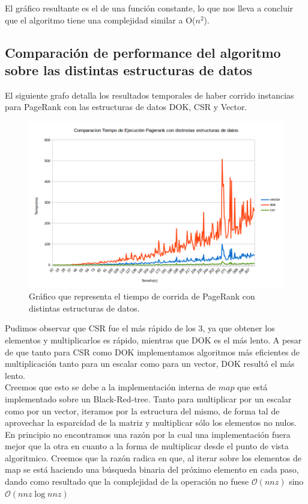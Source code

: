 El gráfico resultante es el de una función constante, lo que nos lleva a concluir que el algoritmo tiene una complejidad similar a O($n^{2}$).

\subsection{Comparación de performance del algoritmo sobre las distintas estructuras de datos}

El siguiente grafo detalla los resultados temporales de haber corrido instancias para PageRank con las estructuras de datos DOK, CSR y Vector.

\begin{figure}[h]
  \includegraphics[scale=0.4]{imagenes/comparacion-tiempo-ejecucion-csr-dok-vector.png}
   \caption{Gráfico que representa el tiempo de corrida de PageRank con distintas estructuras de datos.}
  \label{fig:img1}
\end{figure}

Pudimos observar que CSR fue el más rápido de los 3, ya que obtener los elementos y multiplicarlos es rápido, mientras que DOK es el más lento. A pesar de que tanto para CSR como DOK implementamos algoritmos más eficientes de multiplicación tanto para un escalar como para un vector, DOK resultó el más lento. \\

Creemos que esto se debe a la implementación interna de $map$ que está implementado sobre un Black-Red-tree. Tanto para multiplicar por un escalar como por un vector, iteramos por la estructura del mismo, de forma tal de aprovechar la esparcidad de la matriz y multiplicar sólo los elementos no nulos. En principio no encontramos una razón por la cual una implementación fuera mejor que la otra en cuanto a la forma de multiplicar desde el punto de vista algoritmico. Creemos que la razón radica en que, al iterar sobre los elementos de map se está haciendo una búsqueda binaria del próximo elemento en cada paso, dando como resultado que la complejidad de la operación no fuese $\mathcal{O}(nnz)$ sino $\mathcal{O}(nnz\log{}nnz)$ \\

